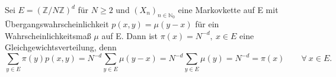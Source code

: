 Sei $E = (\mathbb{Z}/N \mathbb{Z})^{d}$ für $N \geq 2$ und $(X_{n})_{n \in \mathbb{N}_{0}}$ eine Markovkette auf E mit Übergangswahrscheinlichkeit $p(x,y) = \mu (y-x)$ für ein Wahrscheinlichkeitsmaß $\mu$ auf E. Dann ist $\pi(x) = N^{-d}, \: x \in E$ eine Gleichgewichtsverteilung, denn
\begin{equation*}
\sum_{y \in E} \pi(y)p(x,y) = N^{-d} \sum_{y \in E} \mu (y-x) = N^{-d} \sum_{y \in E} \mu (y) =  N^{-d} = \pi (x) \qquad \forall \: x \in E.
\end{equation*}